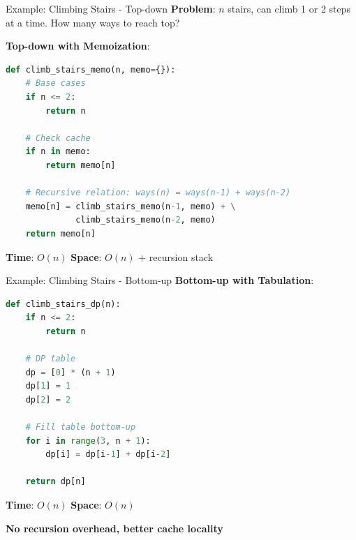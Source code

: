 \documentclass[aspectratio=169]{beamer}
\begin{document}
\begin{frame}[fragile]{Example: Climbing Stairs - Top-down}
  \textbf{Problem}: $n$ stairs, can climb 1 or 2 steps at a time. How many ways to reach top?

  \vspace{0.3cm}

  \textbf{Top-down with Memoization}:
\begin{lstlisting}[language=Python, basicstyle=\ttfamily\footnotesize]
def climb_stairs_memo(n, memo={}):
    # Base cases
    if n <= 2:
        return n

    # Check cache
    if n in memo:
        return memo[n]

    # Recursive relation: ways(n) = ways(n-1) + ways(n-2)
    memo[n] = climb_stairs_memo(n-1, memo) + \
              climb_stairs_memo(n-2, memo)
    return memo[n]
\end{lstlisting}

  \textbf{Time}: $O(n)$ \quad \textbf{Space}: $O(n)$ + recursion stack
\end{frame}

\begin{frame}[fragile]{Example: Climbing Stairs - Bottom-up}
  \textbf{Bottom-up with Tabulation}:
\begin{lstlisting}[language=Python, basicstyle=\ttfamily\footnotesize]
def climb_stairs_dp(n):
    if n <= 2:
        return n

    # DP table
    dp = [0] * (n + 1)
    dp[1] = 1
    dp[2] = 2

    # Fill table bottom-up
    for i in range(3, n + 1):
        dp[i] = dp[i-1] + dp[i-2]

    return dp[n]
\end{lstlisting}

  \textbf{Time}: $O(n)$ \quad \textbf{Space}: $O(n)$

  \vspace{0.3cm}

  \textbf{No recursion overhead, better cache locality}
\end{frame}
\end{document}
